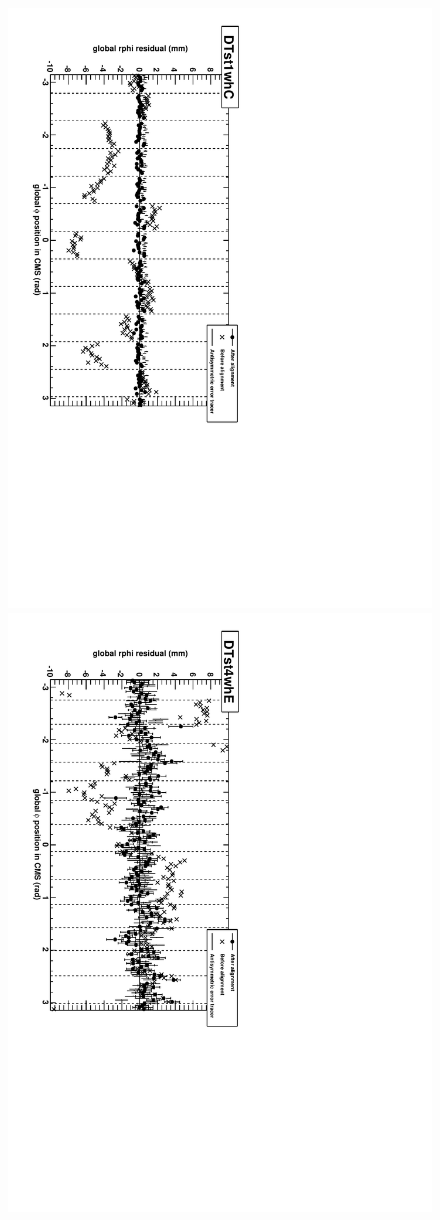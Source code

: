 \documentclass[12pt]{article}
\begin{document}
\begin{figure}
\hspace{0.5 cm} \includegraphics[height=0.8\linewidth, angle=90]{examplemap_rphi1.pdf}

\hfill \includegraphics[height=0.8\linewidth, angle=90]{examplemap_rphi4.pdf} \hspace{0.5 cm}


\end{figure}
\end{document}
